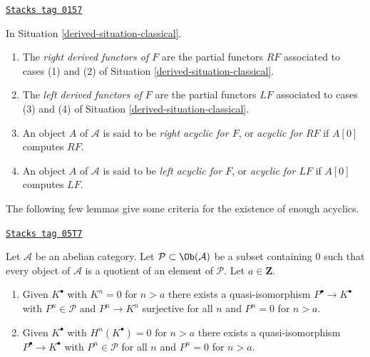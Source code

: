 \begin{definition}
\label{derived-definition-derived-functor}
\href{https://stacks.math.columbia.edu/tag/0157}{\texttt{Stacks tag 0157}}

In
Situation \ref{derived-situation-classical}.
\begin{enumerate}
\item The {\it right derived functors of $F$} are the partial functors
$RF$ associated to cases (1) and (2) of
Situation \ref{derived-situation-classical}.
\item The {\it left derived functors of $F$} are the partial functors
$LF$ associated to cases (3) and (4) of
Situation \ref{derived-situation-classical}.
\item An object $A$ of $\mathcal{A}$ is said to be
{\it right acyclic for $F$}, or {\it acyclic for $RF$}
if $A[0]$ computes $RF$.
\item An object $A$ of $\mathcal{A}$ is said to be
{\it left acyclic for $F$}, or {\it acyclic for $LF$}
if $A[0]$ computes $LF$.
\end{enumerate}
\end{definition}

The following few lemmas give some criteria for the existence of
enough acyclics.

\begin{lemma}
\label{derived-lemma-subcategory-left-resolution}
\href{https://stacks.math.columbia.edu/tag/05T7}{\texttt{Stacks tag 05T7}}

Let $\mathcal{A}$ be an abelian category. Let
$\mathcal{P} \subset \Ob(\mathcal{A})$ be a subset containing $0$
such that every object of $\mathcal{A}$ is a quotient of an element of
$\mathcal{P}$. Let $a \in \mathbf{Z}$.
\begin{enumerate}
\item Given $K^\bullet$ with $K^n = 0$ for $n > a$
there exists a quasi-isomorphism $P^\bullet \to K^\bullet$
with $P^n \in \mathcal{P}$ and $P^n \to K^n$ surjective
for all $n$ and $P^n = 0$ for $n > a$.
\item Given $K^\bullet$ with $H^n(K^\bullet) = 0$ for $n > a$
there exists a quasi-isomorphism $P^\bullet \to K^\bullet$
with $P^n \in \mathcal{P}$ for all $n$ and $P^n = 0$ for $n > a$.
\end{enumerate}
\end{lemma}

